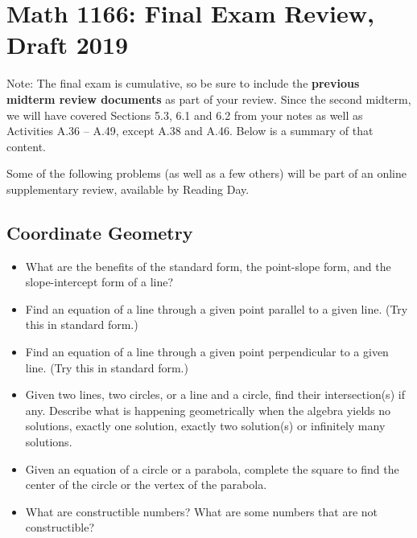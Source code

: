 \newpage

\section{Math 1166: Final Exam Review, Draft 2019}

Note:  The final exam is cumulative, so be sure to include the \textbf{previous midterm review documents} as part of your review.  
Since the second midterm, we will have covered Sections 5.3, 6.1 and 6.2 from your notes as well as Activities A.36 -- A.49, except A.38 and A.46.  Below is a summary of that content.  

Some of the following problems (as well as a few others) will be part of an online supplementary review, available by Reading Day.  


\subsection*{Coordinate Geometry}
\begin{itemize}\itemsep-3pt
\item What are the benefits of the standard form, the point-slope form, and the slope-intercept form of a line?  
\item Find an equation of a line through a given point parallel to a given line.  (Try this in standard form.)  
\item Find an equation of a line through a given point perpendicular to a given line.  (Try this in standard form.) 
\item Given two lines, two circles, or a line and a circle, find their intersection(s) if any.  Describe what is happening geometrically when the algebra yields no solutions, exactly one solution, exactly two solution(s) or infinitely many solutions. 
\item Given an equation of a circle or a parabola, complete the square to find the center of the circle or the vertex of the parabola.  
\item What are constructible numbers?  What are some numbers that are not constructible? 
\end{itemize}

